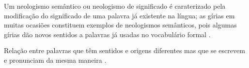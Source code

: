 \begin{mydefinition} 
\label{def:NeologismoSemantico}
Um neologismo semântico ou neologismo de significado é caraterizado pela modificação do significado de uma palavra já existente na língua;
as gírias em muitas ocasiões constituem exemplos de neologismos semânticos, 
pois algumas gírias dão novos sentidos a palavras já usadas no vocabulário formal \cite[pp. 82-83]{correalingua}.
\end{mydefinition}


\begin{mydefinition}[Homonímia:] 
\label{def:Homonimia}
Relação entre palavras que têm sentidos e origens diferentes
 mas que se escrevem e pronunciam da mesma maneira \cite{priberamhomonimia}.
\end{mydefinition}

